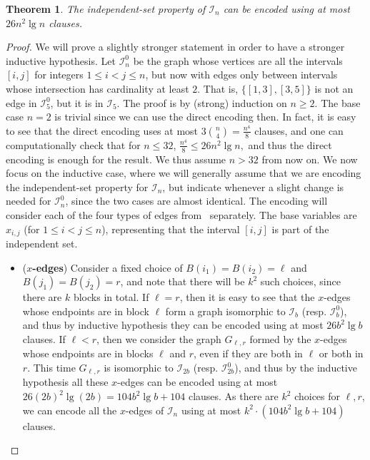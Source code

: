 \documentclass[11pt]{article}
\newtheorem{theorem}{Theorem}
\begin{document}
\begin{theorem}\label{thm:intervals_formal}
    The independent-set property of $\mathcal{I}_n$ can be encoded using at most $26 n^2 \lg n$ clauses.
\end{theorem}
\begin{proof}
    \newcommand{\rnk}{\textsf{rnk}}
    We will prove a slightly stronger statement in order to have a stronger inductive hypothesis. Let $\mathcal{I}^0_n$ be the graph whose vertices are all the intervals $[i, j]$ for integers $1 \leq i < j \leq n$, but now with edges only between intervals whose intersection has cardinality at least $2$. That is, $\{[1, 3], [3, 5]\}$ is not an edge in $\mathcal{I}^0_5$, but it is in $\mathcal{I}_5$. 
    The proof is by (strong) induction on $n \geq 2$. The base case $n = 2$ is trivial since we can use the direct encoding then. In fact, it is easy to see that the direct encoding uses at most $3\binom{n}{4} = \frac{n^4}{8}$ clauses, and one can computationally check that for $n \leq 32$, 
    \(
        \frac{n^4}{8} \leq 26 n^2 \lg n,
    \)
    and thus the direct encoding is enough for the result. We thus assume $n > 32$ from now on.
    We now focus on the inductive case, where we will generally assume that we are encoding the independent-set property for $\mathcal{I}_n$, but indicate whenever a slight change is needed for $\mathcal{I}^0_n$, since the two cases are almost identical.
    The encoding will consider each of the four types of edges from~ separately.
    The base variables are $x_{i, j}$ (for $1 \leq i < j \leq n$), representing that the interval $[i, j]$ is part of the independent set.

    \begin{itemize}
        \item (\textbf{$x$-edges})  Consider a fixed choice of $B(i_1) = B(i_2) = \ell$ and $B(j_1) = B(j_2) = r$, and note that there will be $k^2$ such choices, since there are $k$ blocks in total. If $\ell = r$, then it is easy to see that the $x$-edges whose endpoints are in block $\ell$ form a graph isomorphic to $\mathcal{I}_{b}$ (resp. $\mathcal{I}^0_{b}$), and thus by inductive hypothesis they can be encoded using at most $26 b^2 \lg b$ clauses. If $\ell < r$, then we consider the graph $G_{\ell, r}$ formed by the $x$-edges whose endpoints are in blocks $\ell$ and $r$, even if they are both in $\ell$ or both in $r$. This time $G_{\ell, r}$ is isomorphic to $\mathcal{I}_{2b}$ (resp. $\mathcal{I}^0_{2b}$), and thus by the inductive hypothesis all these $x$-edges can be encoded using at most $26 (2b)^2 \lg(2b) = 104 b^2 \lg b + 104$ clauses. 
        As there are $k^2$ choices for $\ell, r$, we can encode all the $x$-edges of $\mathcal{I}_n$ using at most
        \(
        k^2 \cdot (104 b^2 \lg b + 104)
        \) clauses.
    

\end{itemize}
\end{proof}
\end{document}
